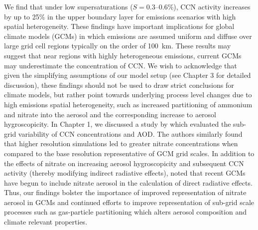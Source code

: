 We find that under low supersaturations ($S=0.3\mbox{--}0.6\%$), CCN activity increases by up to 25\% in the upper boundary layer for emissions scenarios with high spatial heterogeneity. These findings have important implications for global climate models (GCMs) in which emissions are assumed uniform and diffuse over large grid cell regions typically on the order of 100~km. These results may suggest that near regions with highly heterogeneous emissions, current GCMs may underestimate the concentration of CCN. We wish to acknowledge that given the simplifying assumptions of our model setup (see Chapter 3 for detailed discussion), these findings should not be used to draw strict conclusions for climate models, but rather point towards underlying process level changes due to high emissions spatial heterogeneity, such as increased partitioning of ammonium and nitrate into the aerosol and the corresponding increase to aerosol hygroscopicity. In Chapter 1, we discussed a study by \textcite{weigum_effect_2016} which evaluated the sub-grid variability of CCN concentrations and AOD. The authors similarly found that higher resolution simulations led to greater nitrate concentrations when compared to the base resolution representative of GCM grid scales. In addition to the effects of nitrate on increasing aerosol hygroscopicity and subsequent CCN activity (thereby modifying indirect radiative effects), \textcite{weigum_effect_2016} noted that recent GCMs have begun to include nitrate aerosol in the calculation of direct radiative effects. Thus, our findings bolster the importance of improved representation of nitrate aerosol in GCMs and continued efforts to improve representation of sub-grid scale processes such as gas-particle partitioning which alters aerosol composition and climate relevant properties.





